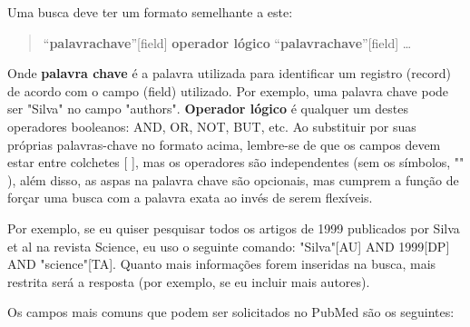 \documentclass[letter,11pt]{book}
\begin{document}
Uma busca deve ter um formato semelhante a este:

\begin{quote}
``\textbf{palavrachave}''[field] \textbf{operador lógico}  ``\textbf{palavrachave}''[field] \ldots
\end{quote}

Onde \textbf{palavra chave} é a palavra utilizada para identificar um registro (record) de acordo com o campo (field) utilizado. Por exemplo, uma palavra chave pode ser "Silva" no campo "authors". \textbf{Operador lógico} é qualquer um destes operadores booleanos: AND, OR, NOT, BUT, etc. Ao substituir por suas próprias palavras-chave no formato acima, lembre-se de que os campos devem estar entre colchetes [ ], mas os operadores são independentes (sem os símbolos, "" ), além disso, as aspas na palavra chave são opcionais, mas cumprem a função de forçar uma busca com a palavra exata ao invés de serem flexíveis. 

Por exemplo, se eu quiser pesquisar todos os artigos de 1999 publicados por Silva et al na revista Science, eu uso o seguinte comando: "Silva"[AU] AND 1999[DP] AND "science"[TA]. Quanto mais informações forem inseridas na busca, mais restrita será a resposta (por exemplo, se eu incluir mais autores). 

Os campos mais comuns que podem ser solicitados no PubMed são os seguintes:
\end{document}

